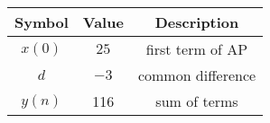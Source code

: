 \begin{tabular}{|c|c|c|}
		\hline
		\textbf{Symbol} & \textbf{Value} &
		\textbf{Description}\\[6pt]
		\hline
		$x(0)$ & $25$ & first term of AP\\[6pt]
		\hline
		$d$ & $-3$ & common difference\\[6pt]
		\hline
		$y(n)$ & 116 & sum of terms\\[6pt]
		\hline 
	\end{tabular}
	
